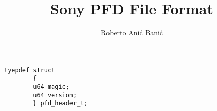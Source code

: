 \documentclass{article}
\begin{document}
    \title{Sony PFD File Format}
    \author{Roberto Anić Banić}
    \maketitle

    \lstset{language=C}
    \begin{lstlisting}[frame=single]
        tyepdef struct
        {
        u64 magic;
        u64 version;
        } pfd_header_t;
    \end{lstlisting}
\end{document}
